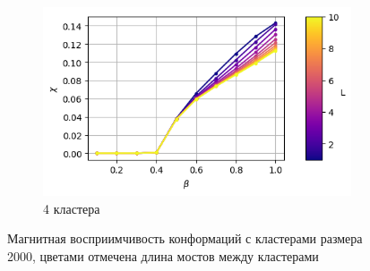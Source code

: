 \begin{figure}[ht]
\begin{subfigure}[t]{0.4\textwidth}
    \end{subfigure}
    \begin{subfigure}[t]{0.4\textwidth}
        \includegraphics*[width=\textwidth]{../images/magnetic_susceptibility/clusterized_W20_H50_N4.png}
        \caption*{4 кластера}
    \end{subfigure}
	\caption{Магнитная восприимчивость конформаций с кластерами размера 2000, цветами отмечена длина мостов между кластерами}
	\label{fig:cluster_magnetc_sus}
\end{figure}

